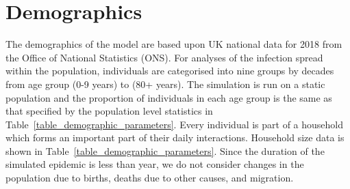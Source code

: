 \documentclass[12pt, oneside]{amsart}   	%
\begin{document}
\section{Demographics}\label{section_ibm_demographics}

The demographics of the model are based upon UK national data for 2018 from the Office of National Statistics (ONS). 
For analyses of the infection spread within the population, individuals are categorised into nine groups by decades from age group (0-9 years) to (80+ years). 
The simulation is run on a static population and the proportion of individuals in each age group is the same as that specified by the population level statistics in Table~\ref{table_demographic_parameters}.
Every individual is part of a household which forms an important part of their daily interactions.
Household size data is shown in Table~\ref{table_demographic_parameters}.
Since the duration of the simulated epidemic is less than year, we do not consider changes in the population due to births, deaths due to other causes, and migration.
\end{document}

